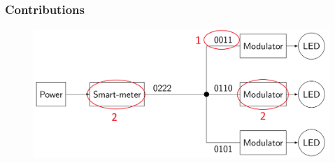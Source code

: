 \documentclass{beamer}
\begin{document}

	\begin{frame}\frametitle{Contributions}



		\begin{figure}
			\centering
			\includegraphics[width=\textwidth]{contributions-figure.png}
		\end{figure}


\end{frame}
\end{document}
